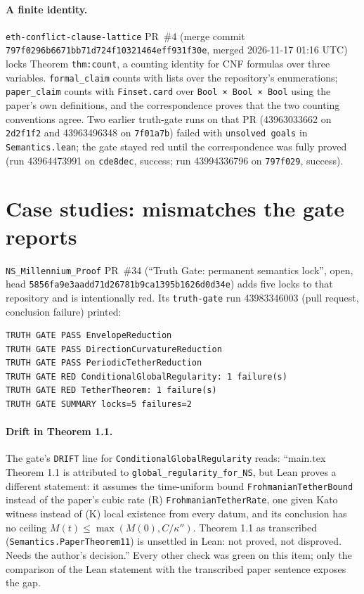 \documentclass[11pt,a4paper]{article}
\newcommand{\code}[1]{\texttt{#1}}
\begin{document}
\paragraph{A finite identity.} \code{eth-conflict-clause-lattice} PR~\#4 (merge commit
\code{797f0296b6671bb71d724f10321464eff931f30e}, merged 2026-11-17 01:16 UTC) locks
Theorem \code{thm:count}, a counting identity for CNF formulas over three variables.
\code{formal\_claim} counts with lists over the repository's enumerations; \code{paper\_claim}
counts with \code{Finset.card} over \code{Bool × Bool × Bool} using the paper's own definitions,
and the correspondence proves that the two counting conventions agree. Two earlier truth-gate
runs on that PR (43963033662 on \code{2d2f1f2} and 43963496348 on \code{7f01a7b}) failed with
\code{unsolved goals} in \code{Semantics.lean}; the gate stayed red until the correspondence was
fully proved (run 43964473991 on \code{cde8dec}, success; run 43994336796 on \code{797f029},
success).

\section{Case studies: mismatches the gate reports}

\code{NS\_Millennium\_Proof} PR~\#34 (``Truth Gate: permanent semantics lock'', open, head
\code{5856fa9e3aadd71d26781b9ca1395b1626d0d34e}) adds five locks to that repository and is
intentionally red. Its \code{truth-gate} run 43983346003 (pull request, conclusion failure)
printed:
\begin{Verbatim}
TRUTH GATE PASS EnvelopeReduction
TRUTH GATE PASS DirectionCurvatureReduction
TRUTH GATE PASS PeriodicTetherReduction
TRUTH GATE RED ConditionalGlobalRegularity: 1 failure(s)
TRUTH GATE RED TetherTheorem: 1 failure(s)
TRUTH GATE SUMMARY locks=5 failures=2
\end{Verbatim}

\paragraph{Drift in Theorem 1.1.} The gate's \code{DRIFT} line for
\code{ConditionalGlobalRegularity} reads: ``main.tex Theorem 1.1 is attributed to
\code{global\_regularity\_for\_NS}, but Lean proves a different statement: it assumes the
time-uniform bound \code{FrohmanianTetherBound} instead of the paper's cubic rate (R)
\code{FrohmanianTetherRate}, one given Kato witness instead of (K) local existence from every
datum, and its conclusion has no ceiling $M(t)\le\max(M(0),C/\kappa'')$. Theorem 1.1 as
transcribed (\code{Semantics.PaperTheorem11}) is unsettled in Lean: not proved, not disproved.
Needs the author's decision.'' Every other check was green on this item; only the
comparison of the Lean statement with the transcribed paper sentence exposes the gap.
\end{document}
